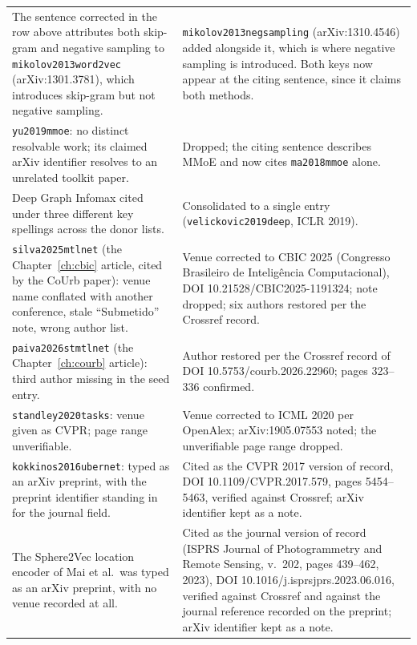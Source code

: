 {\begin{longtable}{@{}p{}p{}@{}}
\addlinespace
The sentence corrected in the row above attributes both skip-gram and negative sampling to
\texttt{mikolov2013word2vec} (arXiv:1301.3781), which introduces skip-gram but not negative
sampling. &
\texttt{mikolov2013negsampling} (arXiv:1310.4546) added alongside it, which is where negative
sampling is introduced. Both keys now appear at the citing sentence, since it claims both
methods. \\
\addlinespace
\texttt{yu2019mmoe}: no distinct resolvable work; its claimed arXiv identifier
resolves to an unrelated toolkit paper. &
Dropped; the citing sentence describes MMoE and now cites \texttt{ma2018mmoe} alone. \\
\addlinespace
Deep Graph Infomax cited under three different key spellings across the donor
lists. &
Consolidated to a single entry (\texttt{velickovic2019deep}, ICLR 2019). \\
\addlinespace
\texttt{silva2025mtlnet} (the Chapter~\ref{ch:cbic} article, cited by the CoUrb
paper): venue name conflated with another conference, stale ``Submetido''
note, wrong author list. &
Venue corrected to CBIC 2025 (Congresso Brasileiro de Intelig\^encia Computacional),
DOI 10.21528/CBIC2025-1191324; note dropped; six authors restored per the Crossref
record. \\
\addlinespace
\texttt{paiva2026stmtlnet} (the Chapter~\ref{ch:courb} article): third author
missing in the seed entry. &
Author restored per the Crossref record of DOI 10.5753/courb.2026.22960; pages
323--336 confirmed. \\
\addlinespace
\texttt{standley2020tasks}: venue given as CVPR; page range unverifiable. &
Venue corrected to ICML 2020 per OpenAlex; arXiv:1905.07553 noted; the unverifiable
page range dropped. \\
\addlinespace
\texttt{kokkinos2016ubernet}: typed as an arXiv preprint, with the preprint identifier
standing in for the journal field. &
Cited as the CVPR 2017 version of record, DOI 10.1109/CVPR.2017.579, pages
5454--5463, verified against Crossref; arXiv identifier kept as a note. \\
\addlinespace
The Sphere2Vec location encoder of Mai et al.\ was typed as an arXiv preprint, with no
venue recorded at all. &
Cited as the journal version of record (ISPRS Journal of Photogrammetry and Remote
Sensing, v.~202, pages 439--462, 2023), DOI 10.1016/j.isprsjprs.2023.06.016, verified
against Crossref and against the journal reference recorded on the preprint; arXiv
identifier kept as a note. \\

\end{longtable}}
